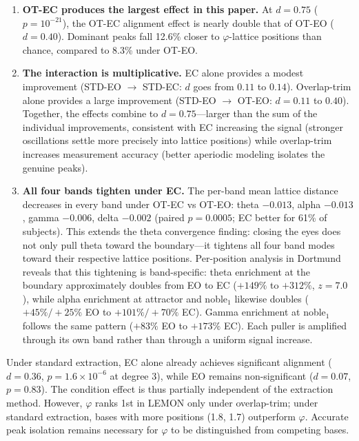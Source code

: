 \documentclass[11pt,a4paper]{article}
\newcommand{\phisym}{\varphi}
\begin{document}
\begin{enumerate}
\item \textbf{OT-EC produces the largest effect in this paper.} At $d = 0.75$ ($p = 10^{-21}$), the OT-EC alignment effect is nearly double that of OT-EO ($d = 0.40$). Dominant peaks fall 12.6\% closer to $\phisym$-lattice positions than chance, compared to 8.3\% under OT-EO.

\item \textbf{The interaction is multiplicative.} EC alone provides a modest improvement (STD-EO $\to$ STD-EC: $d$ goes from $0.11$ to $0.14$). Overlap-trim alone provides a large improvement (STD-EO $\to$ OT-EO: $d = 0.11$ to $0.40$). Together, the effects combine to $d = 0.75$---larger than the sum of the individual improvements, consistent with EC increasing the signal (stronger oscillations settle more precisely into lattice positions) while overlap-trim increases measurement accuracy (better aperiodic modeling isolates the genuine peaks).

\item \textbf{All four bands tighten under EC.} The per-band mean lattice distance decreases in every band under OT-EC vs OT-EO: theta $-0.013$, alpha $-0.013$, gamma $-0.006$, delta $-0.002$ (paired $p = 0.0005$; EC better for 61\% of subjects). This extends the theta convergence finding: closing the eyes does not only pull theta toward the boundary---it tightens all four band modes toward their respective lattice positions. Per-position analysis in Dortmund reveals that this tightening is band-specific: theta enrichment at the boundary approximately doubles from EO to EC ($+149\%$ to $+312\%$, $z = 7.0$), while alpha enrichment at attractor and noble$_1$ likewise doubles ($+45\%/+25\%$ EO to $+101\%/+70\%$ EC). Gamma enrichment at noble$_1$ follows the same pattern ($+83\%$ EO to $+173\%$ EC). Each puller is amplified through its own band rather than through a uniform signal increase.
\end{enumerate}

\noindent Under standard extraction, EC alone already achieves significant alignment ($d = 0.36$, $p = 1.6 \times 10^{-6}$ at degree 3), while EO remains non-significant ($d = 0.07$, $p = 0.83$). The condition effect is thus partially independent of the extraction method. However, $\phisym$ ranks 1st in LEMON only under overlap-trim; under standard extraction, bases with more positions (1.8, 1.7) outperform $\phisym$. Accurate peak isolation remains necessary for $\phisym$ to be distinguished from competing bases.
\end{document}
